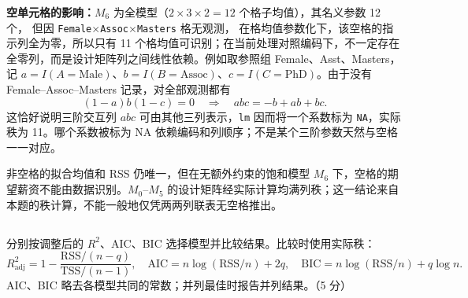 \documentclass[12pt,a4paper]{article}
\begin{document}
\begin{answerbox}
\textbf{空单元格的影响：}$M_6$ 为全模型（$2\times 3\times 2=12$ 个格子均值），其名义参数 12 个，
但因 \texttt{Female}$\times$\texttt{Assoc}$\times$\texttt{Masters} 格无观测，
在格均值参数化下，该空格的指示列全为零，所以只有 11 个格均值可识别；在当前处理对照编码下，不一定存在全零列，而是设计矩阵列之间线性依赖。例如取参照组 Female、Asst、Masters，记 $a=I(A=\mathrm{Male})$、$b=I(B=\mathrm{Assoc})$、$c=I(C=\mathrm{PhD})$。由于没有 Female--Assoc--Masters 记录，对全部观测都有
$$
(1-a)b(1-c)=0
\quad\Longrightarrow\quad abc=-b+ab+bc.
$$
这恰好说明三阶交互列 $abc$ 可由其他三列表示，\texttt{lm} 因而将一个系数标为 \texttt{NA}，实际秩为 11。哪个系数被标为 NA 依赖编码和列顺序；不是某个三阶参数天然与空格一一对应。

非空格的拟合均值和 RSS 仍唯一，但在无额外约束的饱和模型 $M_6$ 下，空格的期望薪资不能由数据识别。$M_0$--$M_5$ 的设计矩阵经实际计算均满列秩；这一结论来自本题的秩计算，不能一般地仅凭两两列联表无空格推出。
\end{answerbox}

\subsection{}

分别按调整后的 $R^2$、AIC、BIC 选择模型并比较结果。比较时使用实际秩：
\[
R^2_{\mathrm{adj}}=1-\frac{\mathrm{RSS}/(n-q)}{\mathrm{TSS}/(n-1)},\quad
\mathrm{AIC}=n\log(\mathrm{RSS}/n)+2q,\quad
\mathrm{BIC}=n\log(\mathrm{RSS}/n)+q\log n.
\]
AIC、BIC 略去各模型共同的常数；并列最佳时报告并列结果。（5 分）
\end{document}
